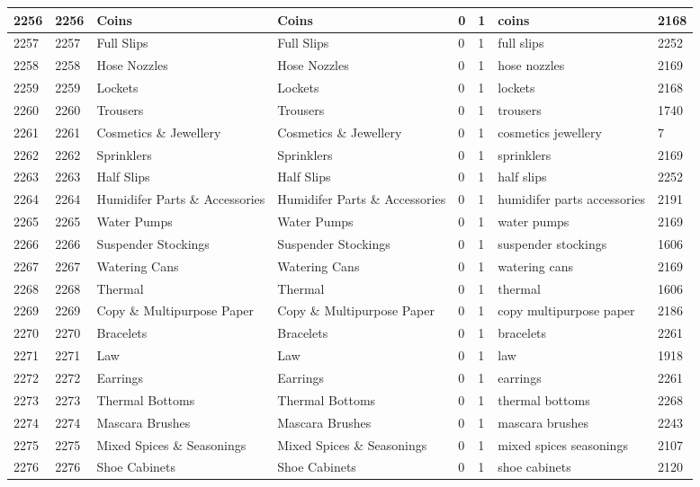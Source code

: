 \begin{longtable}{|l|l|l|l|l|l|l|l|}
2256 & 2256 & Coins & Coins & 0 & 1 & coins & 2168 \\ \hline 
2257 & 2257 & Full Slips & Full Slips & 0 & 1 & full slips & 2252 \\ \hline 
2258 & 2258 & Hose Nozzles & Hose Nozzles & 0 & 1 & hose nozzles & 2169 \\ \hline 
2259 & 2259 & Lockets & Lockets & 0 & 1 & lockets & 2168 \\ \hline 
2260 & 2260 & Trousers & Trousers & 0 & 1 & trousers & 1740 \\ \hline 
2261 & 2261 & Cosmetics \& Jewellery & Cosmetics \& Jewellery & 0 & 1 & cosmetics jewellery & 7 \\ \hline 
2262 & 2262 & Sprinklers & Sprinklers & 0 & 1 & sprinklers & 2169 \\ \hline 
2263 & 2263 & Half Slips & Half Slips & 0 & 1 & half slips & 2252 \\ \hline 
2264 & 2264 & Humidifer Parts \& Accessories & Humidifer Parts \& Accessories & 0 & 1 & humidifer parts accessories & 2191 \\ \hline 
2265 & 2265 & Water Pumps & Water Pumps & 0 & 1 & water pumps & 2169 \\ \hline 
2266 & 2266 & Suspender Stockings & Suspender Stockings & 0 & 1 & suspender stockings & 1606 \\ \hline 
2267 & 2267 & Watering Cans & Watering Cans & 0 & 1 & watering cans & 2169 \\ \hline 
2268 & 2268 & Thermal & Thermal & 0 & 1 & thermal & 1606 \\ \hline 
2269 & 2269 & Copy \& Multipurpose Paper & Copy \& Multipurpose Paper & 0 & 1 & copy multipurpose paper & 2186 \\ \hline 
2270 & 2270 & Bracelets & Bracelets & 0 & 1 & bracelets & 2261 \\ \hline 
2271 & 2271 & Law & Law & 0 & 1 & law & 1918 \\ \hline 
2272 & 2272 & Earrings & Earrings & 0 & 1 & earrings & 2261 \\ \hline 
2273 & 2273 & Thermal Bottoms & Thermal Bottoms & 0 & 1 & thermal bottoms & 2268 \\ \hline 
2274 & 2274 & Mascara Brushes & Mascara Brushes & 0 & 1 & mascara brushes & 2243 \\ \hline 
2275 & 2275 & Mixed Spices \& Seasonings & Mixed Spices \& Seasonings & 0 & 1 & mixed spices seasonings & 2107 \\ \hline 
2276 & 2276 & Shoe Cabinets & Shoe Cabinets & 0 & 1 & shoe cabinets & 2120 \\ \hline 

\end{longtable}
